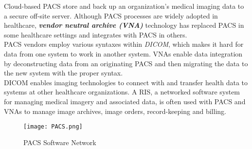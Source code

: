 \documentclass[12pt]{article}
\begin{document}
Cloud-based PACS store and back up an organization's medical imaging data to a secure off-site server. \newline 
Although PACS processes are widely adopted in healthcare, \textbf{\emph{vendor neutral archive (VNA) }}technology has replaced PACS in some healthcare settings and integrates with PACS in others.\newline \\
PACS vendors employ various syntaxes within \emph{DICOM}, which makes it hard for data from one system to work in another system. VNAs enable data integration by deconstructing data from an originating PACS and then migrating the data to the new system with the proper syntax.\newline \\
DICOM enables imaging technologies to connect with and transfer health data to systems at other healthcare organizations. A RIS, a networked software system for managing medical imagery and associated data, is often used with PACS and VNAs to manage image archives, image orders, record-keeping and billing.
\begin{figure}
    \centering
    \texttt{[image: PACS.png]}
    \caption{PACS Software Network}
\end{figure}
\newpage
\end{document}
